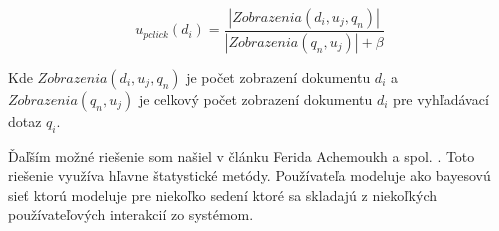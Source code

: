 \begin{equation} \label{eq:pclick}
u_{pclick}(d_i) = \frac{|Zobrazenia(d_i, u_j, q_n)|}{|Zobrazenia(q_n, u_j)| + \beta}
\end{equation}

Kde \(Zobrazenia(d_i, u_j, q_n)\) je počet zobrazení dokumentu \(d_i\) a 
\(Zobrazenia(q_n, u_j)\) je celkový počet zobrazení dokumentu \(d_i\)
pre vyhľadávací dotaz \(q_i\).

Ďaľším možné riešenie som našiel v článku Ferida Achemoukh a spol. \cite{achemoukh}. Toto
riešenie využíva hľavne štatystické metódy. Používateľa modeluje ako bayesovú sieť ktorú
modeluje pre niekoľko sedení ktoré sa skladajú z niekoľkých používateľových interakcií zo 
systémom.

